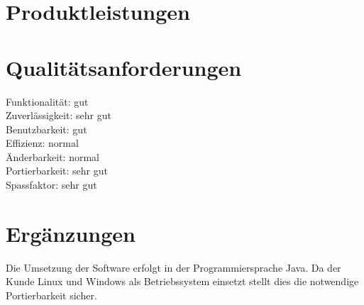 \section{Produktleistungen} %

\section{Qualitätsanforderungen} %
Funktionalität:	\hspace{15 mm}		gut\\
Zuverlässigkeit:\hspace{15 mm}		sehr gut\\
Benutzbarkeit:	\hspace{15 mm}		gut\\
Effizienz:	\hspace{15 mm}		normal\\
Änderbarkeit:	\hspace{15 mm}		normal\\
Portierbarkeit:	\hspace{15 mm}		sehr gut\\
Spassfaktor:	\hspace{15 mm}		sehr gut\\
\section{Ergänzungen} %
Die Umsetzung der Software erfolgt in der Programmiersprache Java. Da der Kunde Linux und Windows als Betriebssystem einsetzt stellt dies die notwendige Portierbarkeit sicher.


